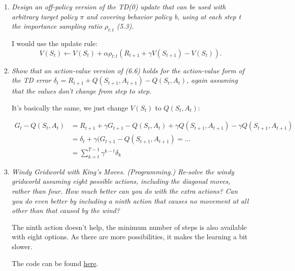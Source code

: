 \documentclass[12pt,a4paper]{article}
\begin{document}
\begin{enumerate}
\item
\textit{Design an off-policy version of the TD(0) update that can be used with
arbitrary target policy $\pi$ and covering behavior policy b, using at each step t the importance
sampling ratio $\rho_{t:t}$ (5.3).}

I would use the update rule:
\[V(S_t) \leftarrow V(S_t) + \alpha \rho_{t:t} (R_{t + 1} + \gamma V(S_{t + 1}) - V(S_t)).\]

\item
\textit{Show that an action-value version of (6.6) holds for the action-value form
of the TD error $\delta_t = R_{t+1} + Q(S_{t+1}, A_{t+1}) - Q(S_t, A_t)$, again
assuming that the values don’t change from step to step.}

It's basically the same, we just change $V(S_t)$ to $Q(S_t, A_t)$:

\begin{align*}
  G_t - Q(S_t, A_t) &= R_{t + 1} + \gamma G_{t + 1} - Q(S_t, A_t)
  + \gamma Q(S_{t + 1}, A_{t + 1}) - \gamma Q(S_{t + 1}, A_{t + 1})\\
  &= \delta_t + \gamma (G_{t + 1} - Q(S_{t + 1}, A_{t + 1}) = \dots \\
  &= \sum\limits_{k = t}^{T - 1} \gamma^{k - t} \delta_k
\end{align*}

\item
\textit{Windy Gridworld with King’s Moves. (Programming.) Re-solve the windy
gridworld assuming eight possible actions, including the diagonal moves, rather than four.
How much better can you do with the extra actions? Can you do even better by including
a ninth action that causes no movement at all other than that caused by the wind?}

The ninth action doesn't help, the minimum number of steps is also available with
eight options. As there are more possibilities, it makes the learning a bit slower.

The code can be found \href{https://github.com/hannagabor/SBRL}{here}.


\end{enumerate}
\end{document}
